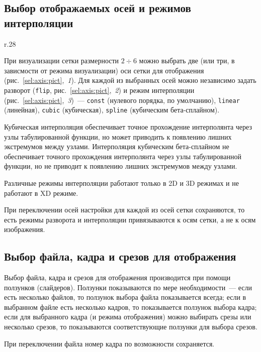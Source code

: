 \documentclass[12pt]{article}
\begin{document}

\subsection{Выбор отображаемых осей и режимов интерполяции}
\begin{wrapfigure}{r}{.28\textwidth}
  \caption{Выбор отображаемых осей и режимов интерполяции}\label{sel:axis:pict}
\end{wrapfigure}
При визуализации сетки размерности $2\div6$ можно выбрать две (или три, в зависмости от режима визуализации)
оси сетки для отображения (рис.~\ref{sel:axis:pict},~{\it 1}). Для каждой из выбранных осей можно независимо задать разворот
(\verb'flip', рис.~\ref{sel:axis:pict},~{\it 2})
и режим интерполяции (рис.~\ref{sel:axis:pict},~{\it 3})~--- \verb'const' (нулевого порядка, по умолчанию),
\verb'linear' (линейная), \verb'cubic' (кубическая), \verb'spline' (кубическим бета-сплайном). 

Кубическая интерполяция обеспечивает точное прохождение интерполянта через узлы табулированной функции, но может приводить к появлению лишних экстремумов между узлами.
Интерполяция кубическим бета-сплайном не обеспечивает точного прохождения интерполянта через узлы табулированной функции,
но не приводит к появлению лишних экстремумов между узлами.

Различные режимы интерполяции работают только в 2D и 3D режимах и не работают в XD режиме.

При переключении осей настройки для каждой из осей сетки сохраняются, то есть режимы разворота и интерполяции привязываются к осям сетки, а не к осям изображения.

\subsection{Выбор файла, кадра и срезов для отображения}
Выбор файла, кадра и срезов для отображения производится при помощи ползунков (слайдеров).
Ползунки показываются по мере необходимости~--- если есть несколько файлов, то ползунок выбора файла показывается всегда;
если в выбранном файле есть несколько кадров, то показывается ползунок выбора кадра;
если для выбранного кадра (и режима отображения) можно выбирать срезы или несколько срезов, то показываются
соответствующие ползунки для выбора срезов.

При переключении файла номер кадра по возможности сохраняется.
\end{document}
